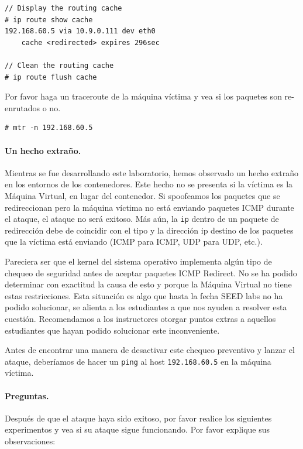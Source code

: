 \begin{lstlisting}
// Display the routing cache 
# ip route show cache
192.168.60.5 via 10.9.0.111 dev eth0
    cache <redirected> expires 296sec

// Clean the routing cache
# ip route flush cache
\end{lstlisting}

Por favor haga un traceroute de la máquina víctima y vea si los paquetes son re-enrutados o no.

\begin{lstlisting}
# mtr -n 192.168.60.5
\end{lstlisting}


\paragraph{Un hecho extraño.} Mientras se fue desarrollando este laboratorio, hemos observado un hecho extraño en los entornos de los contenedores. Este hecho no se presenta si la víctima es la Máquina Virtual, en lugar del contenedor.
Si spoofeamos los paquetes que se redireccionan pero la máquina víctima no está enviando paquetes ICMP durante el ataque, el ataque no será exitoso.
Más aún, la \texttt{ip} dentro de un paquete de redirección debe de coincidir con el tipo y la dirección ip destino de los paquetes que la víctima está enviando (ICMP para ICMP, UDP para UDP, etc.).

Pareciera ser que el kernel del sistema operativo implementa algún tipo de chequeo de seguridad antes de aceptar paquetes ICMP Redirect.
No se ha podido determinar con exactitud la causa de esto y porque la Máquina Virtual no tiene estas restricciones.
Esta situación es algo que hasta la fecha SEED labs no ha podido solucionar, se alienta a los estudiantes a que nos ayuden a resolver esta cuestión. Recomendamos a los instructores otorgar puntos extras a aquellos estudiantes que hayan podido solucionar este inconveniente.

Antes de encontrar una manera de desactivar este chequeo preventivo y lanzar el ataque, deberíamos de hacer un \texttt{ping} al host \texttt{192.168.60.5} en la máquina víctima.


\paragraph{Preguntas.} Después de que el ataque haya sido exitoso, por favor realice los siguientes experimentos y vea si su ataque sigue funcionando. Por favor explique sus observaciones:

